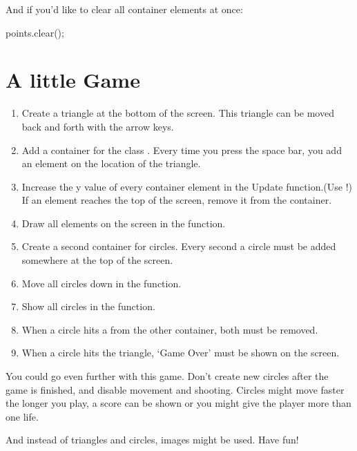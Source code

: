 And if you'd like to clear all container elements at once:

\begin{code}
points.clear();
\end{code}

\section{A little Game}

\begin{enumerate}
\item Create a triangle at the bottom of the screen. This triangle can be moved back and forth with the arrow keys.
\item Add a container for the class . Every time you press the space bar, you add an element on the location of the triangle.
\item Increase the y value of every container element in the Update function.(Use !) If an element reaches the top of the screen, remove it from the container.
\item Draw all elements on the screen in the  function.
\item Create a second container for circles. Every second a circle must be added somewhere at the top of the screen.
\item Move all circles down in the  function.
\item Show all circles in the  function.
\item When a circle hits a  from the other container, both must be removed.
\item When a circle hits the triangle, `Game Over' must be shown on the screen.
\end{enumerate}

You could go even further with this game. Don't create new circles after the game is finished, and disable movement and shooting. Circles might move faster the longer you play, a score can be shown or you might give the player more than one life.

And instead of triangles and circles, images might be used. Have fun!